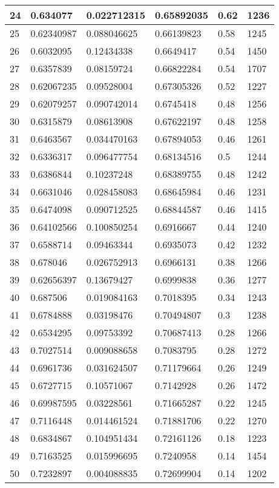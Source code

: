 \begin{longtable}{|l|l|l|l|l|l|}
24 & 0.634077 & 0.022712315 & 0.65892035 & 0.62 & 1236 \\ \hline 
25 & 0.62340987 & 0.088046625 & 0.66139823 & 0.58 & 1245 \\ \hline 
26 & 0.6032095 & 0.12434338 & 0.6649417 & 0.54 & 1450 \\ \hline 
27 & 0.6357839 & 0.08159724 & 0.66822284 & 0.54 & 1707 \\ \hline 
28 & 0.62067235 & 0.09528004 & 0.67305326 & 0.52 & 1227 \\ \hline 
29 & 0.62079257 & 0.090742014 & 0.6745418 & 0.48 & 1256 \\ \hline 
30 & 0.6315879 & 0.08613908 & 0.67622197 & 0.48 & 1258 \\ \hline 
31 & 0.6463567 & 0.034470163 & 0.67894053 & 0.46 & 1261 \\ \hline 
32 & 0.6336317 & 0.096477754 & 0.68134516 & 0.5 & 1244 \\ \hline 
33 & 0.6386844 & 0.10237248 & 0.68389755 & 0.48 & 1242 \\ \hline 
34 & 0.6631046 & 0.028458083 & 0.68645984 & 0.46 & 1231 \\ \hline 
35 & 0.6474098 & 0.090712525 & 0.68844587 & 0.46 & 1415 \\ \hline 
36 & 0.64102566 & 0.100850254 & 0.6916667 & 0.44 & 1240 \\ \hline 
37 & 0.6588714 & 0.09463344 & 0.6935073 & 0.42 & 1232 \\ \hline 
38 & 0.678046 & 0.026752913 & 0.6966131 & 0.38 & 1266 \\ \hline 
39 & 0.62656397 & 0.13679427 & 0.6999838 & 0.36 & 1277 \\ \hline 
40 & 0.687506 & 0.019084163 & 0.7018395 & 0.34 & 1243 \\ \hline 
41 & 0.6784888 & 0.03198476 & 0.70494807 & 0.3 & 1238 \\ \hline 
42 & 0.6534295 & 0.09753392 & 0.70687413 & 0.28 & 1266 \\ \hline 
43 & 0.7027514 & 0.009088658 & 0.7083795 & 0.28 & 1272 \\ \hline 
44 & 0.6961736 & 0.031624507 & 0.71179664 & 0.26 & 1249 \\ \hline 
45 & 0.6727715 & 0.10571067 & 0.7142928 & 0.26 & 1472 \\ \hline 
46 & 0.69987595 & 0.03228561 & 0.71665287 & 0.22 & 1245 \\ \hline 
47 & 0.7116448 & 0.014461524 & 0.71881706 & 0.22 & 1270 \\ \hline 
48 & 0.6834867 & 0.104951434 & 0.72161126 & 0.18 & 1223 \\ \hline 
49 & 0.7163525 & 0.015996695 & 0.7240958 & 0.14 & 1454 \\ \hline 
50 & 0.7232897 & 0.004088835 & 0.72699904 & 0.14 & 1202 \\ \hline 
\end{longtable}